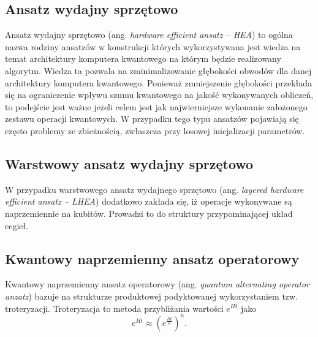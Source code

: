 \documentclass[a4paper,11pt]{article}
\newcommand{\ang}[1]{(ang. \emph{#1})}
\begin{document}
\subsection{Ansatz wydajny sprzętowo}

Ansatz wydajny sprzętowo \ang{hardware efficient ansatz -- HEA} to ogólna nazwa rodziny ansatzów w konstrukcji których wykorzystywana jest wiedza na temat architektury komputera kwantowego na którym będzie realizowany algorytm. Wiedza ta pozwala na zminimalizowanie głębokości obwodów dla danej architektury komputera kwantowego. Ponieważ zmniejszenie głębokości przekłada się na ograniczenie wpływu szumu kwantowego na jakość wykonywanych obliczeń, to podejście jest ważne jeżeli celem jest jak najwierniejsze wykonanie założonego zestawu operacji kwantowych. W przypadku tego typu ansatzów pojawiają się często problemy ze zbieżnością, zwłaszcza przy losowej inicjalizacji parametrów.

\subsection{Warstwowy ansatz wydajny sprzętowo}

W przypadku warstwowego ansatz wydajnego sprzętowo \ang{layered hardware efficient ansatz -- LHEA} dodatkowo zakłada się, iż operacje wykonywane są naprzemiennie na kubitów. Prowadzi to do struktury przypominającej układ cegieł.  

\subsection{Kwantowy naprzemienny ansatz operatorowy}

Kwantowy naprzemienny ansatz operatorowy \ang{quantum alternating operator anzatz} bazuje na strukturze produktowej podyktowanej wykorzystaniem tzw. troteryzacji. Troteryzacja to metoda przybliżania wartości $e^{Ht}$ jako
\begin{equation}
	e^{Ht} \approx \left(e^{\frac{Ht}{n}}\right)^n.
\end{equation}
\end{document}
